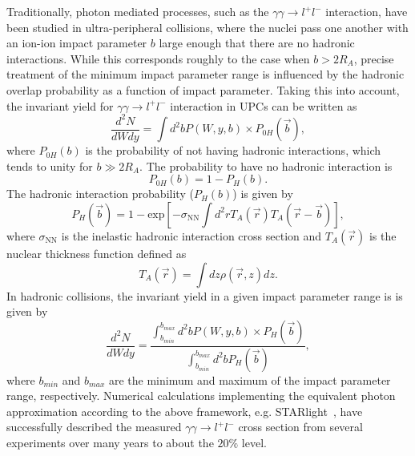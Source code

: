 \documentclass[twocolumn,epjc3]{svjour3}\sloppy
\begin{document}
Traditionally, photon mediated processes, such as the $\gamma\gamma\rightarrow l^+l^-$ interaction, have been studied in ultra-peripheral collisions, where the nuclei pass one another with an ion-ion impact parameter $b$ large enough that there are no hadronic interactions. While this corresponds roughly to the case when $b > 2R_A$, precise treatment of the minimum impact parameter range is influenced by the hadronic overlap probability as a function of impact parameter. Taking this into account, the invariant yield for $\gamma\gamma\rightarrow l^+l^-$ interaction in UPCs can be written as
\begin{equation}
  \frac{d^{2}N}{dWdy}=\int d^{2}b P(W,y,b) \times P_{0H}(\vec{b}),
  \label{equation16}
\end{equation}
where $P_{0H}(b)$ is the probability of not having hadronic interactions, which tends to unity for $b\gg2R_A$. The probability to have no hadronic interaction is 
\begin{equation}
    P_{0H}(b) = 1 - P_{H}(b).
\end{equation}
The hadronic interaction probability ($P_{H}(b)$) is given by
\begin{equation}
  P_{H}(\vec{b}) = 1 - \text{exp}\left[-\sigma_{\text{NN}} \int d^{2}r T_{A}(\vec{r})T_{A}(\vec{r}-\vec{b})\right],
  \label{equation9}
\end{equation}
where $\sigma_{\text{NN}}$ is the inelastic hadronic interaction cross section and $T_{A}(\vec{r})$ is the nuclear thickness function defined as
\begin{equation}
    T_{A}(\vec{r}) = \int dz \rho(\vec{r},z)dz.
  \label{equation10}
\end{equation}
In hadronic collisions, the invariant yield in a given impact parameter range is is given by
\begin{equation}
  \frac{d^{2}N}{dWdy}=\frac{\int^{b_{max}}_{b_{min}} d^{2}b P(W,y,b) \times P_{H}(\vec{b})}{\int^{b_{max}}_{b_{min}} d^{2}b P_{H}(\vec{b})},
  \label{equation16}
\end{equation}
where $b_{min}$ and $b_{max}$ are the minimum and maximum of the impact parameter range, respectively. 
Numerical calculations implementing the equivalent photon approximation according to the above framework, e.g. STARlight~\cite{kleinSTARlightMonteCarlo2017b}, have successfully described the measured $\gamma\gamma \rightarrow l^+l^-$ cross section from several experiments over many years to about the $20\%$ level\cite{abbasCharmoniumPairPhotoproduction2013a,starcollaborationProductionEnsuremathPairs2004,atlascollaborationExclusiveDimuonProduction2020}. 
\end{document}
